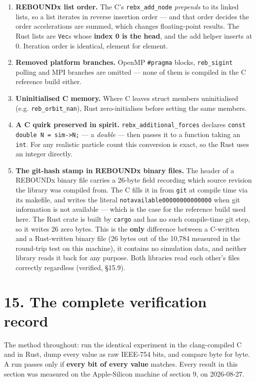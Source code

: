 \documentclass[11pt]{article}
\begin{document}
\begin{enumerate}
\item \textbf{REBOUNDx list order.} The C's \texttt{rebx\_add\_node} \emph{prepends} to its linked lists, so a list iterates in reverse insertion order --- and that order decides the order accelerations are summed, which changes floating-point results. The Rust lists are \texttt{Vec}s whose \textbf{index 0 is the head}, and the add helper inserts at 0. Iteration order is identical, element for element.
\item \textbf{Removed platform branches.} OpenMP \texttt{\#pragma} blocks, \texttt{reb\_sigint} polling and MPI branches are omitted --- none of them is compiled in the C reference build either.
\item \textbf{Uninitialised C memory.} Where C leaves struct members uninitialised (e.g. \texttt{reb\_orbit\_nan}), Rust zero-initialises before setting the same members.
\item \textbf{A C quirk preserved in spirit.} \texttt{rebx\_additional\_forces} declares \texttt{const double N = sim->N;} --- a \emph{double} --- then passes it to a function taking an \texttt{int}. For any realistic particle count this conversion is exact, so the Rust uses an integer directly.
\item \textbf{The git-hash stamp in REBOUNDx binary files.} The header of a REBOUNDx binary file carries a 26-byte field recording which source revision the library was compiled from. The C fills it in from \texttt{git} at compile time via its makefile, and writes the literal \texttt{notavailable00000000000000} when git information is not available --- which is the case for the reference build used here. The Rust crate is built by \texttt{cargo} and has no such compile-time git step, so it writes 26 zero bytes. This is the \textbf{only} difference between a C-written and a Rust-written binary file (26 bytes out of the 10,784 measured in the round-trip test on this machine), it contains no simulation data, and neither library reads it back for any purpose. Both libraries read each other's files correctly regardless (verified, \S{}15.9).
\end{enumerate}

\section{15. The complete verification record}

The method throughout: run the identical experiment in the clang-compiled C and in Rust, dump every value as raw IEEE-754 bits, and compare byte for byte. A run passes only if \textbf{every bit of every value} matches. Every result in this section was measured on the Apple-Silicon machine of section 9, on 2026-08-27.
\end{document}
